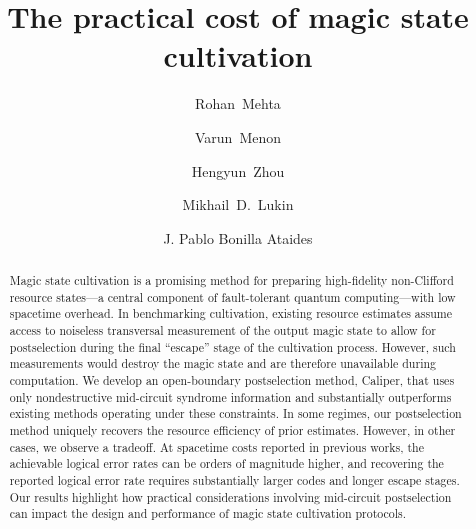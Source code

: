 \documentclass[
    reprint,
    amsmath,amssymb,
    nofootinbib,
    superscriptaddress,
    aps,
    noeprint,
    longbibliography,
    prl
]{revtex4-2}
\theoremstyle{plain}
\begin{document}
\title{The practical cost of magic state cultivation
}

\author{Rohan~Mehta}
\author{Varun~Menon}
\author{Hengyun~Zhou}
\author{Mikhail~D.~Lukin}
\author{J. Pablo Bonilla Ataides}

\begin{abstract}
Magic state cultivation is a promising method for preparing high-fidelity non-Clifford resource states—a central component of fault-tolerant quantum computing—with low spacetime overhead. In benchmarking cultivation, existing resource estimates assume access to noiseless transversal measurement of the output magic state to allow for postselection during the final “escape” stage of the cultivation process. However, such measurements would destroy the magic state and are therefore unavailable during computation. We develop an open-boundary postselection method, Caliper, that uses only nondestructive mid-circuit syndrome information and substantially outperforms existing methods operating under these constraints. In some regimes, our postselection method uniquely recovers the resource efficiency of prior estimates. However, in other cases, we observe a tradeoff. At spacetime costs reported in previous works, the achievable logical error rates can be orders of magnitude higher, and recovering the reported logical error rate requires substantially larger codes and longer escape stages. Our results highlight how practical considerations involving mid-circuit postselection can impact the design and performance of magic state cultivation protocols.
\end{abstract}

\maketitle
\end{document}
